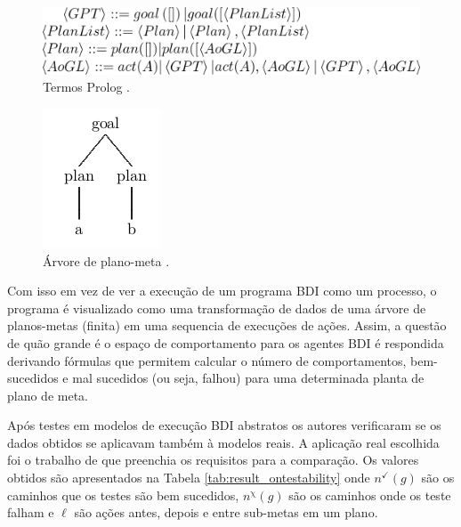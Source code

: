 

\begin{figure}[ht]
\centering
\includegraphics[scale=0.3]{imagens/code.png}
\caption{Termos Prolog \cite{winikoff2014testability}.}
\label{fig:prolog}
\end{figure}

\begin{figure}[ht]
\centering
\includegraphics[scale=0.7]{imagens/simple_tree.png}
\caption{Árvore de plano-meta \cite{winikoff2014testability}.}
\label{fig:arvore}
\end{figure}




Com isso em vez de ver a execução de um programa BDI como um processo, o programa é visualizado como uma transformação de dados de uma árvore de planos-metas (finita) em uma sequencia de execuções de ações. Assim, a questão de quão grande é o espaço de comportamento para os agentes BDI é respondida derivando fórmulas que permitem calcular o número de comportamentos, bem-sucedidos e mal sucedidos (ou seja, falhou) para uma determinada planta de plano de meta.

Após testes em modelos de execução BDI abstratos os autores verificaram se os dados obtidos se aplicavam também à modelos reais. A aplicação real escolhida foi o trabalho de \cite{burmeister2008bdi} que preenchia os requisitos para a comparação. Os valores obtidos são apresentados na Tabela \ref{tab:result_ontestability} onde $n^{\checkmark}(g)$ são os caminhos que os testes são bem sucedidos, $n^{\upchi}(g)$ são os caminhos onde os teste falham e $\ell$ são ações antes, depois e entre sub-metas em um plano.

